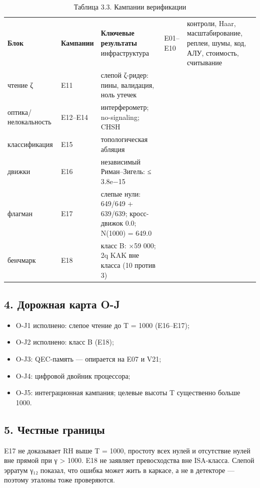 \documentclass[11pt,a4paper]{article}
\begin{document}
\begin{table}[htbp]\centering\small
\caption{Таблица 3.3. Кампании верификации}
\begin{tabular}{p{} p{} p{}}
\toprule
\textbf{Блок} & \textbf{Кампании} & \textbf{Ключевые результаты}
\midrule
инфраструктура & E01–E10 & контроли, Haar, масштабирование, реплеи, шумы, код, АЛУ, стоимость, считывание \\
чтение ζ & E11 & слепой ζ-ридер: пины, валидация, ноль утечек \\
оптика/нелокальность & E12–E14 & интерферометр; no-signaling; CHSH \\
классификация & E15 & топологическая абляция \\
движки & E16 & независимый Риман–Зигель: ≤ 3.8e−15 \\
флагман & E17 & слепые нули: 649/649 + 639/639; кросс-движок 0.0; N(1000) = 649.0 \\
бенчмарк & E18 & класс B: ×59 000; 2q KAK вне класса (10 против 3) \\
\bottomrule
\end{tabular}
\end{table}

\subsection{4. Дорожная карта O-J}

\begin{itemize}
  \item O-J1 исполнено: слепое чтение до T = 1000 (E16–E17);
  \item O-J2 исполнено: класс B (E18);
  \item O-J3: QEC-память — опирается на E07 и V21;
  \item O-J4: цифровой двойник процессора;
  \item O-J5: интеграционная кампания; целевые высоты T существенно больше 1000.
\end{itemize}

\subsection{5. Честные границы}

E17 не доказывает RH выше T = 1000, простоту всех нулей и отсутствие нулей вне прямой при γ > 1000. E18 не заявляет превосходства вне ISA-класса. Слепой эрратум γ₁₂ показал, что ошибка может жить в каркасе, а не в детекторе — поэтому эталоны тоже проверяются.
\end{document}
